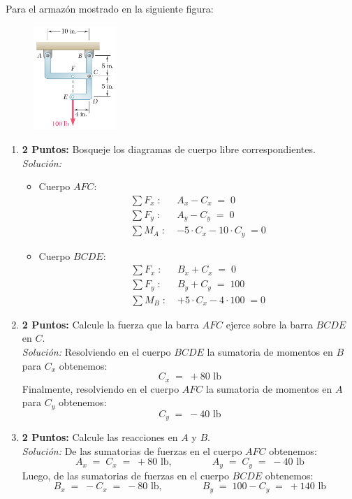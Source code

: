 \documentclass[ a4paper, twoside, 11pt]{article}
\begin{document}
\begin{problem}
Para el armaz\'on mostrado en la siguiente figura:

\begin{figure}[htb]
\centering
\includegraphics[width=0.28\textwidth]{prob-armazon.jpg}
\end{figure}

\begin{enumerate}[label=\textbf{\alph*)}]
\item \textbf{2 Puntos:} Bosqueje los diagramas de cuerpo libre correspondientes. \\[1ex] \emph{Soluci\'on:}
\begin{itemize}
\item Cuerpo $AFC$: 
\begin{align*}
\sum F_x \; \colon \; & A_x - C_x \; = \; 0 \\[1ex]
\sum F_y \; \colon \; & A_y - C_y \; = \; 0 \\[1ex]
\sum M_A \; \colon \; & -5 \cdot C_x -10 \cdot C_y \; = 0
\end{align*}
\item Cuerpo $BCDE$: 
\begin{align*}
\sum F_x \; \colon \; & B_x + C_x \; = \; 0 \\[1ex]
\sum F_y \; \colon \; & B_y + C_y \; = \; 100 \\[1ex]
\sum M_B \; \colon \; & +5 \cdot C_x - 4 \cdot 100 \; = 0
\end{align*}
\end{itemize}

\item \textbf{2 Puntos:} Calcule la fuerza que la barra $AFC$ ejerce sobre la barra $BCDE$ en $C$. \\[1ex] \emph{Soluci\'on:} Resolviendo en el cuerpo $BCDE$ la sumatoria de momentos en $B$ para $C_x$ obtenemos: 
\[
C_x \; = \; +80 \text{ lb}
\]
Finalmente, resolviendo en el cuerpo $AFC$ la sumatoria de momentos en $A$ para $C_y$ obtenemos: 
\[
C_y \; = \; -40 \text{ lb}
\]

\item \textbf{2 Puntos:} Calcule las reacciones en $A$ y $B$. \\[1ex] \emph{Soluci\'on:} De las sumatorias de fuerzas en el cuerpo $AFC$ obtenemos: 
\[
A_x \; = \; C_x \; = \; +80 \text{ lb}, \qquad \qquad
A_y \; = \; C_y \; = \; -40 \text{ lb}
\]
Luego, de las sumatorias de fuerzas en el cuerpo $BCDE$ obtenemos: 
\[
B_x \; = \; -C_x \; = \; -80 \text{ lb}, \qquad \qquad
B_y \; = \; 100 - C_y \; = \; +140 \text{ lb}
\]

\end{enumerate}

\end{problem}
\fullskip
\end{document}
